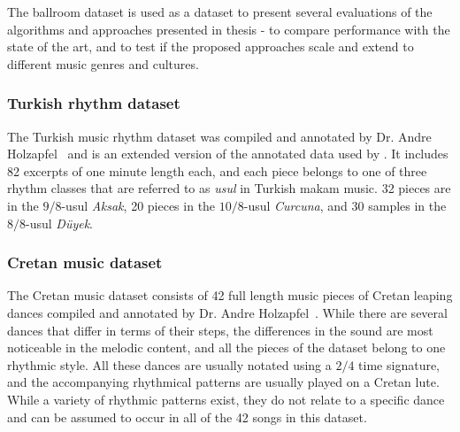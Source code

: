 The ballroom dataset is used as a dataset to present several evaluations of the algorithms and approaches presented in thesis - to compare performance with the state of the art, and to test if the proposed approaches scale and extend to different music genres and cultures. 
\subsubsection{Turkish rhythm dataset}
The Turkish music rhythm dataset was compiled and annotated by Dr. Andre Holzapfel~\cite{holzapfel:14:odd} and is an extended version of the annotated data used by . It includes 82 excerpts of one minute length each, and each piece belongs to one of three rhythm classes that are referred to as \textit{usul} in Turkish makam music. 32 pieces are in the $9/8$-usul \textit{Aksak}, 20 pieces in the $10/8$-usul \textit{Curcuna}, and 30 samples in the $8/8$-usul \textit{D\"uyek}.
\subsubsection{Cretan music dataset} 
The Cretan music dataset consists of 42 full length music pieces of Cretan leaping dances compiled and annotated by Dr. Andre Holzapfel~\cite{holzapfel:14:odd}. While there are several dances that differ in terms of their steps, the differences in the sound are most noticeable in the melodic content, and all the pieces of the dataset belong to one rhythmic style. All these dances are usually notated using a $2/4$ time signature, and the accompanying rhythmical patterns are usually played on a Cretan lute. While a variety of rhythmic patterns exist, they do not relate to a specific dance and can be assumed to occur in all of the 42 songs in this dataset. 

